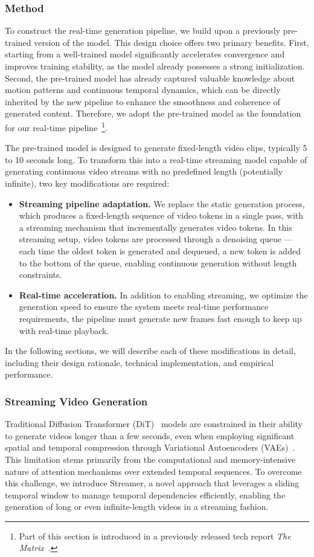 \subsubsection{Method}
To construct the real-time generation pipeline, we build upon a previously pre-trained version of the \method model. This design choice offers two primary benefits. First, starting from a well-trained model significantly accelerates convergence and improves training stability, as the model already possesses a strong initialization. Second, the pre-trained model has already captured valuable knowledge about motion patterns and continuous temporal dynamics, which can be directly inherited by the new pipeline to enhance the smoothness and coherence of generated content. Therefore, we adopt the pre-trained \method model as the foundation for our real-time pipeline~\footnote{Part of this section is introduced in a previously released tech report \emph{The Matrix}~\citep{feng2024matrixinfinitehorizonworldgeneration}.}.

The pre-trained \method model is designed to generate fixed-length video clips, typically 5 to 10 seconds long. To transform this into a real-time streaming model capable of generating continuous video streams with no predefined length (potentially infinite), two key modifications are required:
\begin{itemize}
    \item \textbf{Streaming pipeline adaptation.} We replace the static generation process, which produces a fixed-length sequence of video tokens in a single pass, with a streaming mechanism that incrementally generates video tokens. In this streaming setup, video tokens are processed through a denoising queue — each time the oldest token is generated and dequeued, a new token is added to the bottom of the queue, enabling continuous generation without length constraints.
    \item \textbf{Real-time acceleration.} In addition to enabling streaming, we optimize the generation speed to ensure the system meets real-time performance requirements, \ie the pipeline must generate new frames fast enough to keep up with real-time playback.
\end{itemize}
In the following sections, we will describe each of these modifications in detail, including their design rationale, technical implementation, and empirical performance.


\subsubsection{Streaming Video Generation}
Traditional Diffusion Transformer (DiT)~\citep{dit} models are constrained in their ability to generate videos longer than a few seconds, even when employing significant spatial and temporal compression through Variational Autoencoders (VAEs)~\citep{kingma2013auto}. This limitation stems primarily from the computational and memory-intensive nature of attention mechanisms over extended temporal sequences. To overcome this challenge, we introduce Streamer, a novel approach that leverages a sliding temporal window to manage temporal dependencies efficiently, enabling the generation of long or even infinite-length videos in a streaming fashion.


